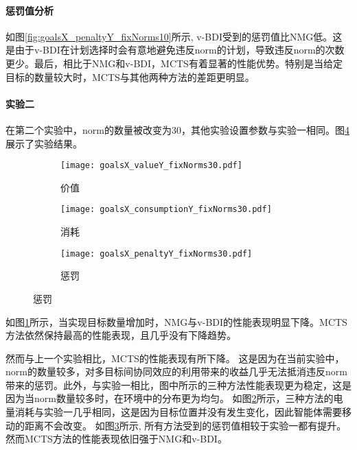 \paragraph{惩罚值分析}
如图\ref{fig:goalsX_penaltyY_fixNorms10}所示, v-BDI受到的惩罚值比NMG低。这是由于v-BDI在计划选择时会有意地避免违反norm的计划，导致违反norm的次数更少。最后，相比于NMG和v-BDI，MCTS有着显著的性能优势。特别是当给定目标的数量较大时，MCTS与其他两种方法的差距更明显。

\paragraph{实验二}
在第二个实验中，norm的数量被改变为30，其他实验设置参数与实验一相同。图\ref{fig:all_fixNorms30}展示了实验结果。

\begin{figure}
\centering
\begin{subfigure}{.47\textwidth}
  \centering
  \texttt{[image: goalsX\_valueY\_fixNorms30.pdf]}
  \captionsetup{justification=centering}
  \caption{价值}
  \label{fig:goalsX_valueY_fixNorms30}
\end{subfigure}

\begin{subfigure}{.47\textwidth}
  \centering
  \texttt{[image: goalsX\_consumptionY\_fixNorms30.pdf]}
  \captionsetup{justification=centering}
  \caption{消耗}
  \label{fig:goalsX_consumptionY_fixNorms30}
\end{subfigure}
\begin{subfigure}{.47\textwidth}
  \centering
  \texttt{[image: goalsX\_penaltyY\_fixNorms30.pdf]}
  \captionsetup{justification=centering}
  \caption{惩罚}
  \label{fig:goalsX_penaltyY_fixNorms30}
\end{subfigure}
\captionsetup{justification=centering}
\label{fig:all_fixNorms30}
\end{figure}

如图\ref{fig:goalsX_valueY_fixNorms30}所示，当实现目标数量增加时，NMG与v-BDI的性能表现明显下降。MCTS方法依然保持最高的性能表现，且几乎没有下降趋势。

然而与上一个实验相比，MCTS的性能表现有所下降。
这是因为在当前实验中，norm的数量较多，对多目标间协同效应的利用带来的收益几乎无法抵消违反norm带来的惩罚。此外，与实验一相比，图中所示的三种方法性能表现更为稳定，这是因为当norm数量较多时，在环境中的分布更为均匀。
如图\ref{fig:goalsX_consumptionY_fixNorms30}所示，三种方法的电量消耗与实验一几乎相同，这是因为目标位置并没有发生变化，因此智能体需要移动的距离不会改变。
如图\ref{fig:goalsX_penaltyY_fixNorms30}所示, 所有方法受到的惩罚值相较于实验一都有提升。然而MCTS方法的性能表现依旧强于NMG和v-BDI。

